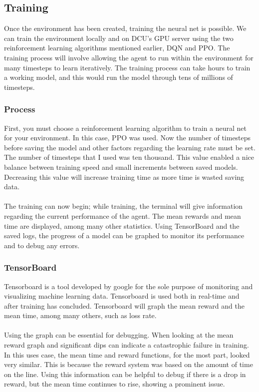 \documentclass[12pt]{article}
\begin{document}
\subsection{Training}
Once the environment has been created, training the neural net is possible. We can train the environment locally and on DCU's GPU server using the two reinforcement learning algorithms mentioned earlier, DQN and PPO. The training process will involve allowing the agent to run within the environment for many timesteps to learn iteratively. The training process can take hours to train a working model, and this would run the model through tens of millions of timesteps. 

\subsubsection{Process}

First, you must choose a reinforcement learning algorithm to train a neural net for your environment. In this case, PPO was used. Now the number of timesteps before saving the model and other factors regarding the learning rate must be set. The number of timesteps that I used was ten thousand. This value enabled a nice balance between training speed and small increments between saved models. Decreasing this value will increase training time as more time is wasted saving data. 
\\\\
The training can now begin; while training, the terminal will give information regarding the current performance of the agent. The mean rewards and mean time are displayed, among many other statistics. Using TensorBoard and the saved logs, the progress of a model can be graphed to monitor its performance and to debug any errors.


\subsubsection{TensorBoard}

Tensorboard is a tool developed by google for the sole purpose of monitoring and visualizing machine learning data. Tensorboard is used both in real-time and after training has concluded. Tensorboard will graph the mean reward and the mean time, among many others, such as loss rate. 
\\\\
Using the graph can be essential for debugging. When looking at the mean reward graph and significant dips can indicate a catastrophic failure in training. In this uses case, the mean time and reward functions, for the most part, looked very similar. This is because the reward system was based on the amount of time on the line. Using this information can be helpful to debug if there is a drop in reward, but the mean time continues to rise, showing a prominent issue.
\end{document}
